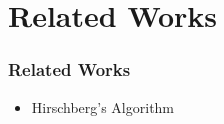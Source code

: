 \section{Related Works}

\begin{frame}
    \frametitle{Related Works}
    \begin{itemize}
    	\item Hirschberg’s Algorithm
    \end{itemize}
\end{frame}